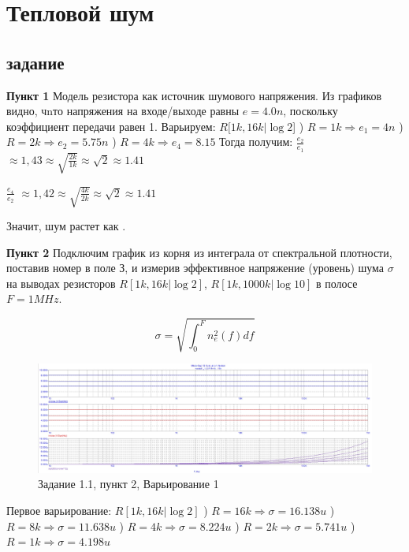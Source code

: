 \documentclass[a4paper, 14pt]{extarticle}%
\date{}
\begin{document}
\section{Тепловой шум}

\subsection{задание}

\textbf{Пункт 1}
\newline
Модель резистора как источник шумового напряжения.
Из графиков видно, чnто напряжения на входе/выходе равны $e = 4.0n$, поскольку коэффициент передачи равен 1. 
Варьируем: $R[1k, 16k | \log2$]
) $R = 1k \Rightarrow e_1 = 4n$
) $R = 2k \Rightarrow e_2 = 5.75n$
) $R = 4k \Rightarrow e_4 = 8.15$
\newline
Тогда получим:
$\frac{e_2}{e_1}$ $\approx 1,43 \approx \sqrt{\frac{2k}{1k}} \approx \sqrt{2} \approx 1.41$

$\frac{e_4}{e_2}$ $\approx 1,42 \approx \sqrt{\frac{4k}{2k}} \approx \sqrt{2} \approx 1.41$

Значит, шум растет как .

\textbf{Пункт 2}
\newline
Подключим график из корня из интеграла от спектральной плотности, поставив номер в поле З, и измерив эффективное напряжение (уровень) шума $\sigma$ на выводах резисторов $R[1k, 16k | \log2]$, $R[1k, 1000k | \log10]$ в полосе $F = 1 MHz$.
\newline

\[ \sigma = \sqrt{\int_0^F n_e^{2}(f)df} \]

\begin{figure}[h!]
			\centering
			\includegraphics[width=1.1\linewidth]{pic1.jpg}
			\caption{Задание 1.1, пункт 2, Варьирование 1}
			\label{A}
\end{figure}

Первое варьирование: $R[1k, 16k | \log2]$
) $R = 16k \Rightarrow \sigma = 16.138u$
) $R = 8k \Rightarrow \sigma = 11.638u$
) $R = 4k \Rightarrow \sigma = 8.224u$
) $R = 2k \Rightarrow \sigma = 5.741u$
) $R = 1k \Rightarrow \sigma = 4.198u$
\newline
\end{document}
